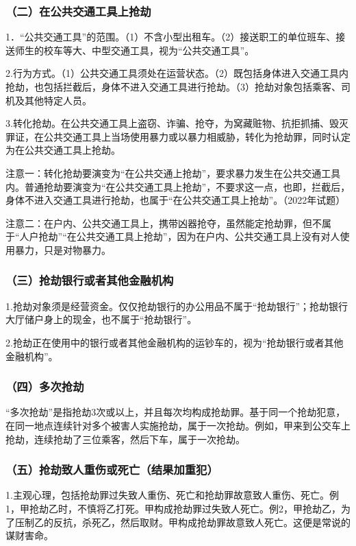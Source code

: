\subsubsection*{（二）在公共交通工具上抢劫}

1．“公共交通工具”的范围。（1）不含小型出租车。（2）接送职工的单位班车、接送师生的校车等大、中型交通工具，视为“公共交通工具”。

2.行为方式。（1）公共交通工具须处在运营状态。（2）既包括身体进入交通工具内抢劫，也包括拦截后，身体不进入交通工具进行抢劫。（3）抢劫对象包括乘客、司机及其他特定人员。

3.转化抢劫。在公共交通工具上盗窃、诈骗、抢夺，为窝藏赃物、抗拒抓捕、毁灭罪证，在公共交通工具上当场使用暴力或以暴力相威胁，转化为抢劫罪，同时认定为在公共交通工具上抢劫。

注意一：转化抢劫要演变为“在公共交通上抢劫”，要求暴力发生在公共交通工具内。普通抢劫要演变为“在公共交通工具上抢劫”，不要求这一点，也即，拦截后，身体不进入交通工具进行抢劫，也属于“在公共交通工具上抢劫”。（2022年试题）

注意二：在户内、公共交通工具上，携带凶器抢夺，虽然能定抢劫罪，但不属于“人户抢劫”“在公共交通工具上抢劫”，因为在户内、公共交通工具上没有对人使用暴力，只是对物暴力。

\subsubsection*{（三）抢劫银行或者其他金融机构}

1.抢劫对象须是经营资金。仅仅抢劫银行的办公用品不属于“抢劫银行”；抢劫银行大厅储户身上的现金，也不属于“抢劫银行”。

2.抢劫正在使用中的银行或者其他金融机构的运钞车的，视为“抢劫银行或者其他金融机构”。

\subsubsection*{（四）多次抢劫}

“多次抢劫”是指抢劫3次或以上，并且每次均构成抢劫罪。基于同一个抢劫犯意，在同一地点连续针对多个被害人实施抢劫，属于一次抢劫。例如，甲来到公交车上抢劫，连续抢劫了三位乘客，然后下车，属于一次抢劫。

\subsubsection*{（五）抢劫致人重伤或死亡（结果加重犯）}

1.主观心理，包括抢劫罪过失致人重伤、死亡和抢劫罪故意致人重伤、死亡。例1，甲抢劫乙时，不慎将乙打死。甲构成抢劫罪过失致人死亡。例2，甲抢劫乙，为了压制乙的反抗，杀死乙，然后取财。甲构成抢劫罪故意致人死亡。这便是常说的谋财害命。

